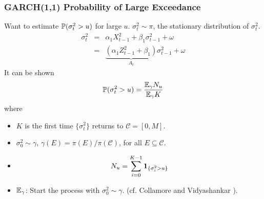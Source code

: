 \documentclass{beamer}
\begin{document}
\begin{frame}
  \frametitle{GARCH(1,1) Probability of Large Exceedance}
    Want to estimate $\P(\sigma_t^2 > u)$ for large $u$. $\sigma_t^2
  \sim \pi$, the stationary distribution of $\sigma_t^2$.
  \begin{eqnarray*}
    \sigma_t^2
    &=&
    \alpha_1 X_{t-1}^2 + \beta_1 \sigma_{t-1}^2 + \omega \\
    &=&
    \underbrace{
      (\alpha_1 Z_{t-1}^2 + \beta_1)
    }_{A_t}  \sigma_{t-1}^2 + \omega
  \end{eqnarray*}
  It can be shown
   \[
   \P(\sigma^2_t > u) = {
     \E_\gamma N_u
     \over
     \E_\gamma K
   }
   \]
   where
   \begin{footnotesize}
     \begin{itemize}
     \item $K$ is the first time $\{\sigma_t^2\}$ returns to
       $\mathcal C = [0, M]$.
     \item $\sigma_0^2 \sim \gamma$,
       $\gamma(E) = \pi(E) / \pi(\mathcal C)$, for all
       $E \subseteq \mathcal C$.
     \item
       \[
       N_u = \sum_{i=0}^{K - 1} \1{\sigma^2_i > u}
       \]
     \item $\E_\gamma$: Start the process with
       $\sigma_0^2 \sim \gamma$. (cf.  Collamore and
       Vidyashankar \cite{Collamore20133378}).
     \end{itemize}
   \end{footnotesize}
 \end{frame}

\end{document}
